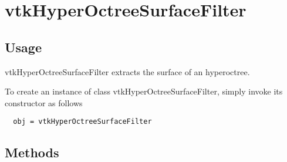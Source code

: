 \section{vtkHyperOctreeSurfaceFilter}

\subsection{Usage}

 vtkHyperOctreeSurfaceFilter extracts the surface of an hyperoctree.

To create an instance of class vtkHyperOctreeSurfaceFilter, simply
invoke its constructor as follows
\begin{verbatim}
  obj = vtkHyperOctreeSurfaceFilter
\end{verbatim}
\subsection{Methods}


